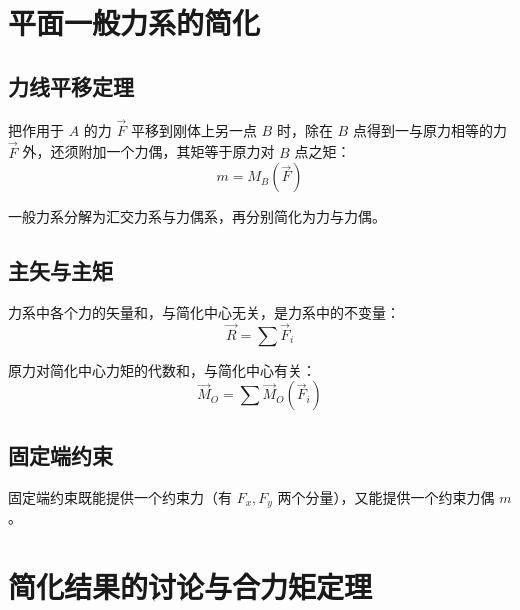 \section{平面一般力系的简化}

\subsection{力线平移定理}

 把作用于 $A$ 的力 $\vec{F}$ 平移到刚体上另一点 $B$ 时，除在 $B$ 点得到一与原力相等的力 $\vec{F}$ 外，还须附加一个力偶，其矩等于原力对 $B$ 点之矩：
\begin{equation}
m=M_B(\vec{F})
\label{eq:2-简化-平移}
\end{equation}

 一般力系分解为汇交力系与力偶系，再分别简化为力与力偶。

\subsection{主矢与主矩}

 力系中各个力的矢量和，与简化中心无关，是力系中的不变量：
\begin{equation}
\vec{R}=\sum\vec{F}_i
\label{eq:2-简化-主矢}
\end{equation}

 原力对简化中心力矩的代数和，与简化中心有关：
\begin{equation}
\vec{M}_O=\sum\vec{M}_O(\vec{F}_i)
\label{eq:2-简化-主矩}
\end{equation}

\subsection{固定端约束}

固定端约束既能提供一个约束力（有 $F_x,F_y$ 两个分量），又能提供一个约束力偶 $m$。

\section{简化结果的讨论与合力矩定理}

